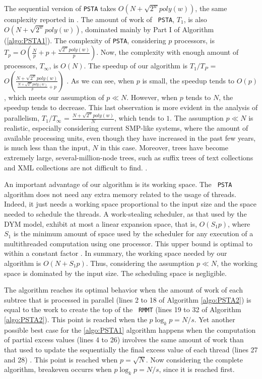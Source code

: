 The sequential version of {\tt PSTA} takes $O(N+\sqrt{2^{w}}poly(w))$,
the same complexity reported in
\cite{Navarro:2014:FFS:2620785.2601073}. The amount of work of {\tt
PSTA}, $T_1$, is also $O(N+\sqrt{2^{w}}poly(w))$, dominated mainly by
Part I of Algorithm (\ref{algo:PSTA1}). The complexity of {\tt PSTA},
considering $p$ processors, is $T_p =
O(\frac{N}{p}+p+\frac{\sqrt{2^{w}}poly(w)}{p})$. Now, the complexity
with enough amount of processors, $T_\infty$, is $O(N)$. The speedup
of our algorithm is $T_1/T_P$ =
$O(\frac{N+\sqrt{2^{w}}poly(w)}{\frac{N+\sqrt{2^{w}}poly(w)}{p}+p})$
. As we can see,
when $p$ is small, the speedup tends to $O(p)$, which meets our
assumption of $p\ll N$. However, when $p$ tends to $N$, the speedup
tends to decrease. This last observation is more evident in the
analysis of parallelism, $T_1/T_{\infty}$ =
$\frac{N+\sqrt{2^{w}}poly(w)}{N}$, which tends to $1$. The assumption
$p\ll N$ is realistic, especially considering current SMP-like
systems, where the amount of available processing units, even though
they have increased in the past few years, is much less than the
input, $N$ in this case. Moreover, trees have become extremely large,
several-million-node trees, such as suffix trees of text collections
and XML collections are not difficult to find. .

An important advantage of our algorithm is its working space. The {\tt
PSTA} algorithm does not need any extra memory related to the usage of
threads. Indeed, it just needs a working space proportional to the
input size and the space needed to schedule the threads. A
work-stealing scheduler, as that used by the DYM model, exhibit at
most a linear expansion space, that is, $O(S_1p)$, where $S_1$ is the
minimum amount of space used by the scheduler for any execution of a
multithreaded computation using one processor. This upper bound is
optimal to within a constant factor
\cite{Blumofe:1999:SMC:324133.324234}. In summary, the working space
needed by our algorithm is $O(N+S_1p)$. Thus, considering the
assumption $p\ll N$, the working space is dominated by the input
size. The scheduling space is negligible.

The algorithm reaches its optimal behavior when the amount of work of
each subtree that is processed in parallel (lines 2 to 18 of Algorithm
\ref{algo:PSTA2}) is equal to the work to create the top of the {\tt
RMMT} (lines 19 to 32 of Algorithm \ref{algo:PSTA2}). This point is
reached when the $p\log_{k}p=N/s$. Yet another possible best case for
the \ref{algo:PSTA1} algorithm happens when the computation of partial
excess values (lines 4 to 26) involves the same amount of work than
that used to update the sequentially the final excess value of each
thread (lines 27 and 28) . This point is reached when
$p=\sqrt{N}$. Now considering the complete algorithm, breakeven
occurrs when $p\log_{k}p=N/s$, since it is reached first. 
